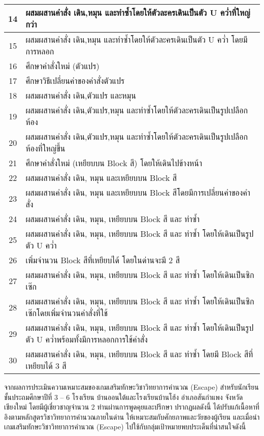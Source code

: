 \begin{center}
\begin{tabular}{|c | m{35em}|}
     \hline
     14 &  ผสมผสานคำสั่ง เดิน,หมุน และทำซ้ำโดยให้ตัวละครเดินเป็นตัว U คว่ำที่ใหญ่กว่า \\ 
     \hline
     15 &  ผสมผสานคำสั่ง เดิน,หมุน และทำซ้ำโดยให้ตัวละครเดินเป็นตัว U คว่ำ โดยมีการหลอก \\ 
     \hline
     16 &  ศึกษาคำสั่งใหม่ (ตัวแปร) \\ 
     \hline
     17 &  ศึกษาวิธีเปลี่ยนค่าของคำสั่งตัวแปร \\ 
     \hline
     18 &  ผสมผสานคำสั่ง เดิน,ตัวแปร และหมุน \\ 
     \hline
     19 &  ผสมผสานคำสั่ง เดิน,ตัวแปร,หมุน และทำซ้ำโดยให้ตัวละครเดินเป็นรูปเปลือกห้อง \\ 
     \hline
     20 &  ผสมผสานคำสั่ง เดิน,ตัวแปร,หมุน และทำซ้ำโดยให้ตัวละครเดินเป็นรูปเปลือกห้องที่ใหญ่ขึ้น \\ 
     \hline
     21 &  ศึกษาคำสั่งใหม่ (เหยียบบน Block สี) โดยให้เดินไปข้างหน้า \\ 
     \hline
     22 &  ผสมผสานคำสั่ง เดิน, หมุน และเหยียบบน Block สี \\ 
     \hline
     23 &  ผสมผสานคำสั่ง เดิน, หมุน และเหยียบบน Block สีโดยมีการเปลี่ยนค่าของคำสั่ง \\ 
     \hline
     24 &  ผสมผสานคำสั่ง เดิน, หมุน, เหยียบบน Block สี และ ทำซ้ำ \\ 
     \hline
     25 &  ผสมผสานคำสั่ง เดิน, หมุน, เหยียบบน Block สี และ ทำซ้ำ โดยให้เดินเป็นรูปตัว U คว่ำ \\ 
     \hline
     26 &  เพิ่มจำนวน Block สีที่เหยียบได้ โดยในด่านจะมี 2 สี \\ 
     \hline
     27 &  ผสมผสานคำสั่ง เดิน, หมุน, เหยียบบน Block สี และ ทำซ้ำ โดยให้เดินเป็นซิกเซ๊ก \\ 
     \hline
     28 &  ผสมผสานคำสั่ง เดิน, หมุน, เหยียบบน Block สี และ ทำซ้ำ โดยให้เดินเป็นซิกเซ๊กโดยเพิ่มจำนวนคำสั่งที่ใช้ \\ 
     \hline
     29 &  ผสมผสานคำสั่ง เดิน, หมุน, เหยียบบน Block สี และ ทำซ้ำ โดยให้เดินเป็นรูปตัว U คว่ำพร้อมทั้งมีการหลอกการใช้คำสั่ง \\ 
     \hline
     30 &  ผสมผสานคำสั่ง เดิน, หมุน, เหยียบบน Block สี และ ทำซ้ำ โดยมี Block สีที่เหยียบได้ 3 สี \\ 
     \hline
    \end{tabular}
\end{center}

จากผลการประเมินความเหมาะสมของเกมเสริมทักษะวิชาวิทยาการคำนวณ (Escape) สำหรับนักเรียนชั้นประถมศึกษาปีที่ 
3 – 6 โรงเรียน บ้านออนใต้และโรงเรียนบ้านโฮ้ง อำเภอสันกำแพง จังหวัดเชียงใหม่ 
โดยมีผู้เชี่ยวชาญจำนวน 2 ท่านผ่านการพูดคุยและปรึกษา ปรากฏผลดังนี้ ได้ปรับแก้เนื้อหาที่อิงตามหลักสูตรวิชาวิทยาการคำนวณภายในด่าน 
ให้เหมาะสมกับศักยภาพและวัยของผู้เรียน และเมื่อนำเกมเสริมทักษะวิชาวิทยาการคำนวณ (Escape) 
ไปใช้กับกลุ่มเป้าหมายพบประเด็นที่น่าสนใจดังนี้

